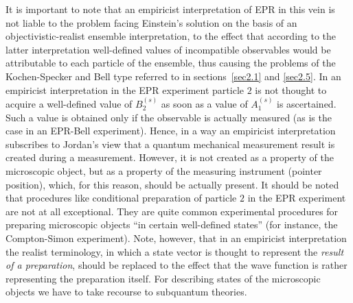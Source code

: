\documentclass[12pt]{article}
\begin{document}
It is important to note that an empiricist interpretation of EPR
in this vein is not liable to the problem facing Einstein's
solution on the basis of an objectivistic-realist ensemble
interpretation, to the effect that according to the latter
interpretation well-defined values of incompatible observables
would be attributable to each particle of the ensemble, thus
causing the problems of the Kochen-Specker and Bell type referred
to in sections~\ref{sec2.1} and \ref{sec2.5}. In an empiricist
interpretation in the EPR experiment particle $2$ is not thought
to acquire a well-defined value of $B^{(s)}_2$ as soon as a value
of $A^{(s)}_1$ is ascertained. Such a value is obtained only if
the observable is actually measured (as is the case in an EPR-Bell
experiment). Hence, in a way an empiricist interpretation
subscribes to Jordan's view that a quantum mechanical measurement
result is created during a measurement. However, it is not created
as a property of the microscopic object, but as a property of the
measuring instrument (pointer position), which, for this reason,
should be actually present. It should be noted that procedures
like conditional preparation of particle $2$ in the EPR experiment
are not at all exceptional. They are quite common experimental
procedures for preparing microscopic objects ``in certain
well-defined states'' (for instance, the Compton-Simon
experiment). Note, however, that in an empiricist interpretation
the realist terminology, in which a state vector is thought to
represent the {\em result of a preparation}, should be replaced to
the effect that the wave function is rather representing the
preparation itself. For describing states of the microscopic
objects we have to take recourse to subquantum theories.
\end{document}
